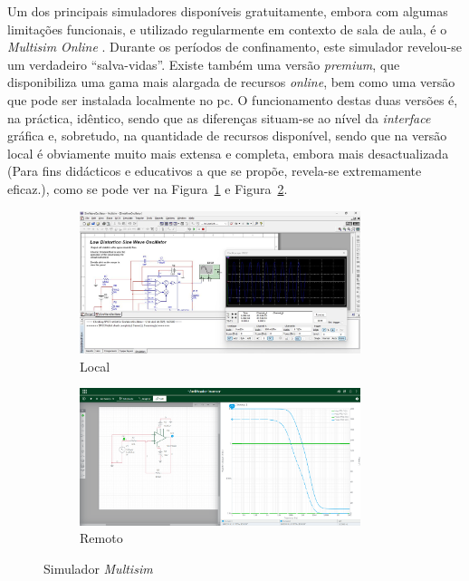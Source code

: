 Um dos principais simuladores disponíveis gratuitamente, embora com algumas limitações funcionais, e utilizado regularmente em contexto de sala de aula, é o \textit{Multisim Online} \cite{multisim}. Durante os períodos de confinamento, este simulador revelou-se um verdadeiro ``salva-vidas''. Existe também uma versão \textit{premium}, que disponibiliza uma gama mais alargada de recursos \textit{online}, bem como uma versão que pode ser instalada localmente no \acrshort{pc}. O funcionamento destas duas versões é, na práctica, idêntico, sendo que as diferenças situam-se ao nível da \textit{interface} gráfica e, sobretudo, na quantidade de recursos disponível, sendo que na versão local é obviamente muito mais extensa e completa, embora mais desactualizada (Para fins didácticos e educativos a que se propõe, revela-se extremamente eficaz.), como se pode ver na Figura~\ref{fig:multisimlocal} e Figura~\ref{fig:multisimremoto}.

\begin{figure}[hbtp]
    \centering
    \begin{subfigure}[hbtp]{0.48\textwidth}
        \centering
        \includegraphics[width=0.9\textwidth]{figures/Multisim_Desktop.png}
        \caption{Local}
        \label{fig:multisimlocal}
    \end{subfigure}
    \begin{subfigure}[hbtp]{0.48\textwidth}
        \includegraphics[width=0.9\textwidth]{figures/Multisim_ACsweep.png}
        \caption{Remoto}
        \label{fig:multisimremoto}
    \end{subfigure}
    \caption{Simulador \textit{Multisim}}
    \label{fig:multisimsimulator}
\end{figure}

